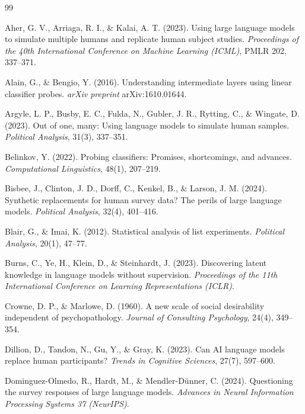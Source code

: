 \documentclass[14pt,a4paper]{extarticle}
\begin{document}
\newpage
\begin{thebibliography}{99}

Aher, G. V., Arriaga, R. I., \& Kalai, A. T. (2023). Using large language models to simulate multiple humans and replicate human subject studies. \textit{Proceedings of the 40th International Conference on Machine Learning (ICML)}, PMLR 202, 337--371.

Alain, G., \& Bengio, Y. (2016). Understanding intermediate layers using linear classifier probes. \textit{arXiv preprint} arXiv:1610.01644.

Argyle, L. P., Busby, E. C., Fulda, N., Gubler, J. R., Rytting, C., \& Wingate, D. (2023). Out of one, many: Using language models to simulate human samples. \textit{Political Analysis}, 31(3), 337--351.

Belinkov, Y. (2022). Probing classifiers: Promises, shortcomings, and advances. \textit{Computational Linguistics}, 48(1), 207--219.

Bisbee, J., Clinton, J. D., Dorff, C., Kenkel, B., \& Larson, J. M. (2024). Synthetic replacements for human survey data? The perils of large language models. \textit{Political Analysis}, 32(4), 401--416.

Blair, G., \& Imai, K. (2012). Statistical analysis of list experiments. \textit{Political Analysis}, 20(1), 47--77.

Burns, C., Ye, H., Klein, D., \& Steinhardt, J. (2023). Discovering latent knowledge in language models without supervision. \textit{Proceedings of the 11th International Conference on Learning Representations (ICLR)}.

Crowne, D. P., \& Marlowe, D. (1960). A new scale of social desirability independent of psychopathology. \textit{Journal of Consulting Psychology}, 24(4), 349--354.

Dillion, D., Tandon, N., Gu, Y., \& Gray, K. (2023). Can AI language models replace human participants? \textit{Trends in Cognitive Sciences}, 27(7), 597--600.

Dominguez-Olmedo, R., Hardt, M., \& Mendler-D\"unner, C. (2024). Questioning the survey responses of large language models. \textit{Advances in Neural Information Processing Systems 37 (NeurIPS)}.


\end{thebibliography}
\end{document}
